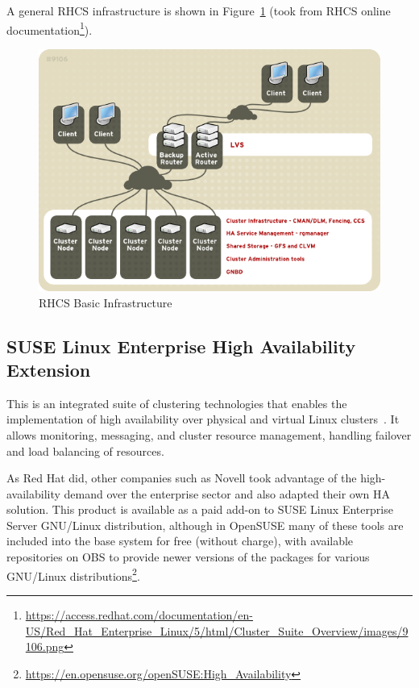 \documentclass[a4paper, 12pt]{book}
\begin{document}
\noindent A general RHCS infrastructure is shown in Figure~\ref{fig:rhcs} (took from RHCS online documentation\footnote{\url{https://access.redhat.com/documentation/en-US/Red\_Hat\_Enterprise\_Linux/5/html/Cluster\_Suite\_Overview/images/9106.png}}).

\FloatBarrier
\begin{figure}[H]
  \centering
  \includegraphics[scale=0.70]{rhcs.png}
  \caption[RHCS Basic Infrastructure]{RHCS Basic Infrastructure}
  \label{fig:rhcs}
\end{figure}


\subsection{SUSE Linux Enterprise High Availability Extension}
\label{subsec:suseha}

This is an integrated suite of clustering technologies that enables the implementation of high availability over physical and virtual Linux clusters~\cite{TandS}. It allows monitoring, messaging, and cluster resource management, handling failover and load balancing of resources.\bigskip

\noindent As Red Hat did, other companies such as Novell took advantage of the high-availability demand over the enterprise sector and also adapted their own HA solution. This product is available as a paid add-on to SUSE Linux Enterprise Server GNU/Linux distribution, although in OpenSUSE many of these tools are included into the base system for free (without charge), with available repositories on OBS to provide newer versions of the packages for various GNU/Linux distributions\footnote{\url{https://en.opensuse.org/openSUSE:High_Availability}}.\bigskip
\end{document}
